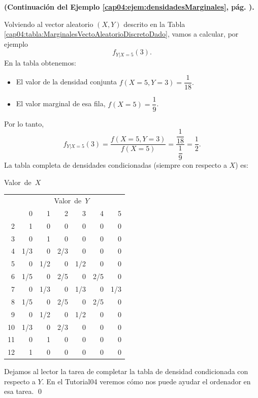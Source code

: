 \begin{ejemplo}
\label{cap04:ejem:densidadesCondicionadas}
{\bf (Continuación del Ejemplo \ref{cap04:ejem:densidadesMarginales}, pág. \pageref{cap04:ejem:densidadesMarginales}).}

Volviendo al vector aleatorio $(X,Y)$ descrito en la  Tabla \ref{cap04:tabla:MarginalesVectoAleatorioDiscretoDado}, vamos a calcular, por ejemplo
\[f_{Y|X=5}(3).\]
En la tabla obtenemos:
\begin{itemize}
  \item El valor de la densidad conjunta $f(X=5, Y=3)=\dfrac{1}{18}.$\\[2mm]
  \item El valor marginal de esa fila, $f(X=5)=\dfrac{1}{9}$.
\end{itemize}
Por lo tanto,
\[f_{Y|X=5}(3)=\dfrac{f(X=5, Y=3)}{f(X=5)}=\dfrac{\dfrac{1}{18}}{\dfrac{1}{9}}=\dfrac{1}{2}.\]
La tabla completa de densidades condicionadas (siempre con respecto a $X$) es:
\begin{center}
{\small
\hspace{-1cm}\mbox{Valor de $X$}\quad
\begin{tabular}{|r|r|r|r|r|r|r|}
 \multicolumn{1}{c}{} &\multicolumn{6}{c}{\mbox{Valor de $Y$}}{}\\
  \cline{2-7}
 \multicolumn{1}{c|}{}& 0 & 1 & 2 & 3 & 4 & 5 \\
  \hline
  2 & 1 & 0 & 0 & 0 & 0 & 0 \\ \hline
  3 & 0 & 1 & 0 & 0 & 0 & 0 \\ \hline
  4 & 1/3 & 0 & 2/3 & 0 & 0 & 0 \\ \hline
  5 & 0 & 1/2 & 0 & 1/2 & 0 & 0 \\ \hline
  6 & 1/5 & 0 & 2/5 & 0 & 2/5 & 0 \\ \hline
  7 & 0 & 1/3 & 0 & 1/3 & 0 & 1/3 \\ \hline
  8 & 1/5 & 0 & 2/5 & 0 & 2/5 & 0 \\ \hline
  9 & 0 & 1/2 & 0 & 1/2 & 0 & 0 \\ \hline
  10 & 1/3 & 0 & 2/3 & 0 & 0 & 0 \\ \hline
  11 & 0 & 1 & 0 & 0 & 0 & 0 \\ \hline
  12 & 1 & 0 & 0 & 0 & 0 & 0 \\ \hline
\end{tabular}
}
\end{center}
Dejamos al lector la tarea de completar la tabla de densidad condicionada con respecto a $Y$. En el Tutorial04 veremos cómo nos puede ayudar el ordenador en esa tarea.
\qed
\end{ejemplo}

